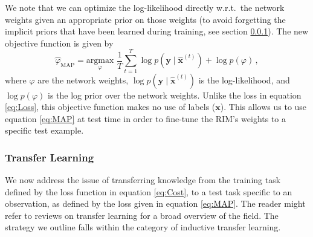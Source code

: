 We note that we can optimize the log-likelihood directly w.r.t.\ the network weights given an appropriate prior on those weights (to avoid forgetting the implicit priors that have been learned during training, see section \ref{sec:transferlearning}). The new objective function is given by
\begin{equation}\label{eq:MAP} 
        \hat{\varphi}_{\mathrm{MAP}} = \underset{\varphi}{\mathrm{argmax}}\,\, 
        \frac{1}{T}\sum_{t=1}^{T} \log p(\mathbf{y} \mid \mathbf{\hat{x}}^{(t)}) + \log p(\varphi) \, ,
\end{equation} 
where $\varphi$ are the network weights, $\log p(\mathbf{y} \mid \mathbf{\hat{x}}^{(t)})$ is the log-likelihood, and $\log p(\varphi) $ is the log prior over the network weights.
Unlike the loss in equation \eqref{eq:Loss}, this objective function makes no use of labels 
($\mathbf{x}$). 
This allows us to use equation \eqref{eq:MAP} at test time in order to fine-tune the RIM's weights to a specific test example. 

\subsubsection{Transfer Learning}
\label{sec:transferlearning}
We now address the issue of transferring knowledge from the training task defined by the loss function in equation \eqref{eq:Cost}, 
to a test task specific to an observation,  as defined by the loss given in equation \eqref{eq:MAP}.
The reader might refer to reviews on transfer learning \citep{Pan2010,Zhuang2019} 
for a broad overview of the field. The strategy we outline falls within 
the category of inductive transfer learning.



